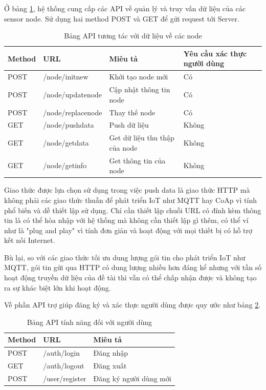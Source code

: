 Ở bảng \ref{table: apilist}, hệ thống cung cấp các API về quản lý và truy vấn dữ liệu của các sensor node. Sử dụng hai method POST và GET để gửi request tới Server. 

\begin{table}[H]
	\centering
	\caption{Bảng API tương tác với dữ liệu về các node}
	\begin{tabular}{|l|l|l|l|}
		\hline
		Method & URL            & Miêu tả         & Yêu cầu xác thực người dùng        \\ \hline
		POST   & /node/initnew       & Khởi tạo node mới                & Có           \\ \hline
		POST   & /node/updatenode     & Cập nhật thông tin node & Có \\ \hline
		POST   & /node/replacenode       & Thay thế node  & Có       \\ \hline
		GET   & /node/pushdata & Push dữ liệu               &         Không                \\ \hline
		GET   & /node/getdata    & Get dữ liệu thu thập của node         &  Không      \\ \hline
		GET   & /node/getinfo   & Get thông tin của node & Không  \\ \hline
	\end{tabular}
	\label{table: apilist}
\end{table}

Giao thức được lựa chọn sử dụng trong việc push data là giao thức HTTP mà không phải các giao thức thuần để phát triển IoT như MQTT hay CoAp vì tính phổ biến và dễ thiết lập sử dụng. Chỉ cần thiết lập chuỗi URL có đính kèm thông tin là có thể hòa nhập với hệ thống mà không cần thiết lập gì thêm, có thể ví như là "plug and play" vì tính đơn giản và hoạt động với mọi thiết bị có hỗ trợ kết nối Internet.

Bù lại, so với các giao thức tối ưu dung lượng gói tin cho phát triển IoT như MQTT, gói tin gửi qua HTTP có dung lượng nhiều hơn đáng kể nhưng với tần số hoạt động truyền dữ liệu của đề tài thì vẫn có thể chấp nhận được và không tạo ra sự khác biệt lớn khi hoạt động.

Về phần API trợ giúp đăng ký và xác thực người dùng được quy ước như bảng \ref{table: apiuser}.
\begin{table}[H]
	\centering
	\caption{Bảng API tính năng đối với người dùng}
	\begin{tabular}{|l|l|l|}
		\hline
		Method & URL            & Miêu tả                \\ \hline
		POST   & /auth/login       & Đăng nhập                           \\ \hline
		GET   & /auth/logout   & Đăng xuất   \\ \hline
		POST   & /user/register     & Đăng ký người dùng mới \\ \hline
	\end{tabular}
	\label{table: apiuser}
\end{table}
